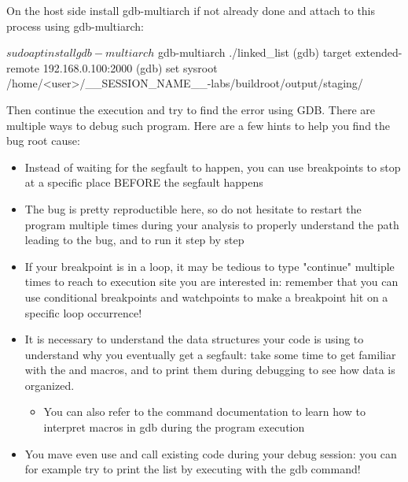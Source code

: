 
On the host side install gdb-multiarch if not already done and attach to this
process using gdb-multiarch:

\begin{bashinput}
$ sudo apt install gdb-multiarch
$ gdb-multiarch ./linked_list
(gdb) target extended-remote 192.168.0.100:2000
(gdb) set sysroot /home/<user>/__SESSION_NAME__-labs/buildroot/output/staging/
\end{bashinput}

Then continue the execution and try to find the error using GDB. There are
multiple ways to debug such program. Here are a few hints to help you find the bug root
cause:
\begin{itemize}
  \item Instead of waiting for the segfault to happen, you can use breakpoints
  to stop at a specific place BEFORE the segfault happens
  \item The bug is pretty reproductible here, so do not hesitate to restart the
  program multiple times during your analysis to properly understand the path
  leading to the bug, and to run it step by step
  \item If your breakpoint is in a loop, it may be tedious to type "continue"
  multiple times to reach to execution site you are interested in: remember
  that you can use conditional breakpoints and watchpoints to make a breakpoint
  hit on a specific loop occurrence!
  \item It is necessary to understand the data structures your code is using to
  understand why you eventually get a segfault: take some time to get familiar
  with the  and  macros, and to print them
  during debugging to see how data is organized.
  \begin{itemize}
    \item You can also refer to the  command documentation to learn
    how to interpret macros in gdb during the program execution
  \end{itemize}
  \item You mave even use and call existing code during your debug session: you
  can for example try to print the list by executing
   with the  gdb command!
\end{itemize}


